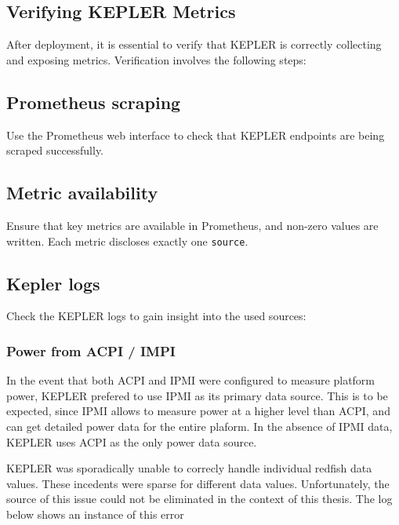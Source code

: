 \subsection{Verifying KEPLER Metrics}

After deployment, it is essential to verify that KEPLER is correctly collecting and exposing metrics. Verification involves the following steps:

\subsection{Prometheus scraping}

Use the Prometheus web interface to check that KEPLER endpoints are being scraped successfully.

\subsection{Metric availability}

Ensure that key metrics are available in Prometheus, and non-zero values are written. Each metric discloses exactly one \texttt{source}.

\subsection{Kepler logs} 

Check the KEPLER logs to gain insight into the used sources:



\subsubsection{Power from ACPI / IMPI}

In the event that both ACPI and IPMI were configured to measure platform power, KEPLER prefered to use IPMI as its primary data source. This is to be expected, since IPMI allows to measure power at a higher level than ACPI, and can get detailed power data for the entire plaform. In the absence of IPMI data, KEPLER uses ACPI as the only power data source. 


KEPLER was sporadically unable to correcly handle individual redfish data values. These incedents were sparse for different data values. Unfortunately, the source of this issue could not be eliminated in the context of this thesis. The log below shows an instance of this error

